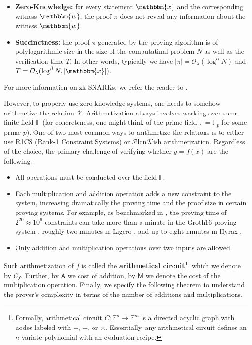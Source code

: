 \documentclass{iacrtrans}
\begin{document}
\begin{definition}
\begin{itemize}
        \item \textbf{Zero-Knowledge:} for every statement $\mathbbm{x}$ and the
        corresponding witness $\mathbbm{w}$, the proof $\pi$ does not reveal any information about the witness
        $\mathbbm{w}$.
        \item \textbf{Succinctness:} the proof $\pi$ generated by the proving
        algorithm is of polylogarithmic size in the size of the computatinal
        problem $N$ as well as the verification time $T$. In other words,
        typically we have $|\pi| = \mathcal{O}_{\lambda}(\log^{\alpha} N)$ and
        $T=\mathcal{O}_{\lambda}(\log^{\beta} N,|\mathbbm{x}|)$.
    \end{itemize}
\end{definition}

For more information on zk-SNARKs, we refer the reader to \cite{zksnark}.

However, to properly use zero-knowledge systems, one needs to somehow
arithmetize the relation $\mathcal{R}$. Arithmetization always involves working
over some finite field $\mathbb{F}$ (for concreteness, one might think of the
prime field $\mathbb{F} = \mathbb{F}_p$ for some prime $p$). One of two most
common ways to arithmetize the relations is to either use R1CS (Rank-1
Constraint Systems) or $\mathcal{P}$lon$\mathcal{K}$ish arithmetization.
Regardless of the choice, the primary challenge of verifying whether $y=f(x)$
are the following:
\begin{itemize}
    \item All operations must be conducted over the field $\mathbb{F}$.
    \item Each multiplication and addition operation adds a new constraint to
    the system, increasing dramatically the proving time and the proof size in
    certain proving systems. For example, as benchmarked in \cite{spartan}, the
    proving time of $2^{20} \approx 10^6$ constraints can take more than a
    minute in the Groth16 proving system \cite{groth16}, roughly two minutes in
    Ligero \cite{ligero}, and up to eight minutes in Hyrax \cite{hyrax}.
    \item Only addition and multiplication operations over two inputs are
    allowed.
\end{itemize}

Such arithmetization of $f$ is called the \textbf{arithmetical
circuit}\footnote{Formally, arithmetical circuit $C: \mathbb{F}^n \to
\mathbb{F}^m$ is a directed acyclic graph with nodes labeled with $+$, $-$, or
$\times$. Essentially, any arithmetical circuit defines an $n$-variate
polynomial with an evaluation recipe.}, which we denote by $C_f$. Further, by
$\mathsf{A}$ we cost of addition, by $\mathsf{M}$ we denote the cost of the
multiplication operation. Finally, we specify the following theorem to
understand the prover's complexity in terms of the number of additions and
multiplications.
\end{document}

